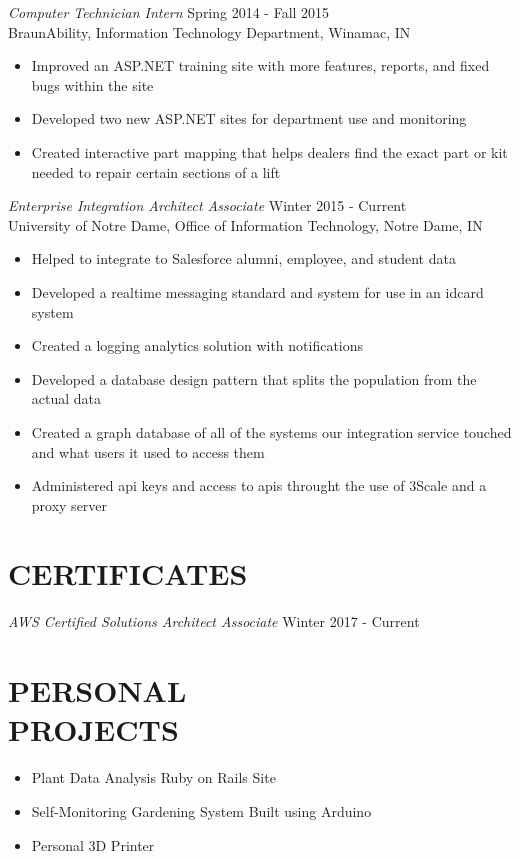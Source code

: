 \documentclass[margin]{res}
\begin{document}
\begin{resume}
{\sl Computer Technician Intern} \hfill Spring 2014 - Fall 2015 \\
                BraunAbility, 
                Information Technology Department, Winamac, IN 
                 \begin{itemize}  \itemsep -2pt %
                 \item Improved an ASP.NET training site with more features, reports, and fixed bugs within the site
                \item   Developed two new ASP.NET sites for department use and monitoring
                \item
                Created interactive part mapping that helps dealers find the exact part or kit needed to repair certain sections of a lift
                \end{itemize}

{\sl Enterprise Integration Architect Associate} \hfill Winter 2015 - Current \\
                University of Notre Dame,
                Office of Information Technology, Notre Dame, IN
                \begin{itemize} \itemsep -2pt
                  \item Helped to integrate to Salesforce alumni, employee, and student data
                  \item Developed a realtime messaging standard and system for use in an idcard system
                  \item Created a logging analytics solution with notifications
                  \item Developed a database design pattern that splits the population from the actual data
                  \item Created a graph database of all of the systems our integration service touched and what users it used to access them
                  \item Administered api keys and access to apis throught the use of 3Scale and a proxy server
                \end{itemize}

\section{CERTIFICATES}
{\sl AWS Certified Solutions Architect Associate} \hfill Winter 2017 - Current

\section{PERSONAL \\ PROJECTS}
            \begin{itemize} \itemsep -2pt
                \item Plant Data Analysis Ruby on Rails Site
                \item Self-Monitoring Gardening System Built using Arduino
                \item Personal 3D Printer
            \end{itemize}
\end{resume}
\end{document}

